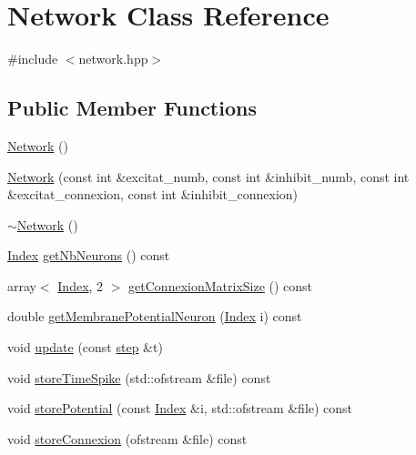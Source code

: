 \hypertarget{classNetwork}{\section{Network Class Reference}
\label{classNetwork}
}


{\ttfamily \#include $<$network.\-hpp$>$}

\subsection*{Public Member Functions}
\begin{DoxyCompactItemize}
\item 
\hyperlink{classNetwork_a3cc2fb4f8fa4d507077e8da85ce5a1c8}{Network} ()
\item 
\hyperlink{classNetwork_a59f36ff8e94a65e0088d99dbd17b249d}{Network} (const int \&excitat\-\_\-numb, const int \&inhibit\-\_\-numb, const int \&excitat\-\_\-connexion, const int \&inhibit\-\_\-connexion)
\item 
\hyperlink{classNetwork_a7a4e19cdb4bf0c7ecf82baa643831492}{$\sim$\-Network} ()
\item 
\hyperlink{constant_8hpp_a5d7deb06d9443e7d4a47bf078638cc91}{Index} \hyperlink{classNetwork_a91b4de88cf516e2971e064fc38e9c938}{get\-Nb\-Neurons} () const 
\item 
array$<$ \hyperlink{constant_8hpp_a5d7deb06d9443e7d4a47bf078638cc91}{Index}, 2 $>$ \hyperlink{classNetwork_a49d5f131ebca7833869c93a7c7ce2e79}{get\-Connexion\-Matrix\-Size} () const 
\item 
double \hyperlink{classNetwork_a3c6253cb84a3a0a23a84befda4a08dbc}{get\-Membrane\-Potential\-Neuron} (\hyperlink{constant_8hpp_a5d7deb06d9443e7d4a47bf078638cc91}{Index} i) const 
\item 
void \hyperlink{classNetwork_ab79d5782d33c2cf69f7a2a00bbc534db}{update} (const \hyperlink{constant_8hpp_a58a8d380569868e765017aef9c749646}{step} \&t)
\item 
void \hyperlink{classNetwork_ad69a9355cb163b97e3d8efede48c1433}{store\-Time\-Spike} (std\-::ofstream \&file) const 
\item 
void \hyperlink{classNetwork_a0a397c35415b2f9255969a13c80af9ec}{store\-Potential} (const \hyperlink{constant_8hpp_a5d7deb06d9443e7d4a47bf078638cc91}{Index} \&i, std\-::ofstream \&file) const 
\item 
void \hyperlink{classNetwork_afd314bc37bd9a5d28df356aeb39b8122}{store\-Connexion} (ofstream \&file) const 
\end{DoxyCompactItemize}
